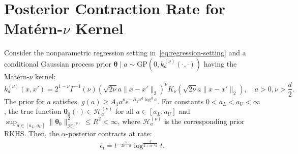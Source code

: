 \documentclass[final,12pt]{colt2026} %
\begin{document}
\section{Posterior Contraction Rate for Mat\'{e}rn-$\nu$ Kernel}
\label{app:matern-contraction-rate}

\begin{lemma}
\label{lemma:matern-contraction-rate}
Consider the nonparametric regression setting in~\eqref{eq:regression-setting} and a conditional Gaussian process prior $\pmb\theta\mid a\sim \mathrm{GP}(0, k_a^{(\nu)}(\cdot, \cdot))$ having the Mat\'{e}rn-$\nu$ kernel: 
$$
k_a^{(\nu)}(x, x') = 2^{1-\nu}\Gamma^{-1}(\nu)(\sqrt{2\nu}a\lVert x-x'\rVert_{2})^{\nu} K_{\nu}(\sqrt{2\nu}a\lVert x-x'\rVert_2), \quad a>0, \nu>\frac{d}{2}.
$$
The prior for $a$ satisfies, $g(a) \geq A_1 a^{p}e^{-B_1 a^{d}\log^{q}a}$. For constants $0<a_L < a_U < \infty$, the true function $\pmb\theta_0(\cdot) \in \mathcal{H}_a^{(\nu)}$ for all $a\in [a_L, a_U]$ and $\sup_{a\in [a_L, a_U]}\lVert \pmb\theta_0\rVert_{\mathcal{H}_a^{(\nu)}}^{2} \leq R^{2} < \infty$, where $\mathcal{H}_a^{(\nu)}$ is the corresponding prior RKHS. Then, the $\alpha$-posterior contracts at rate:
\begin{align*}
\epsilon_t = t^{-\frac{\nu}{2\nu+d}}\log^{\frac{q}{2+\alpha^{-1}d}}t.
\end{align*}
\end{lemma}
\end{document}
